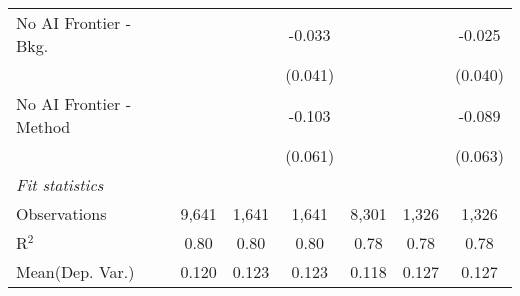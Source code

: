 \begin{tabular}{lcccccc}
   No AI Frontier - Bkg.   &         &              & -0.033  &         &              & -0.025\\   
                           &         &              & (0.041) &         &              & (0.040)\\   
   No AI Frontier - Method &         &              & -0.103  &         &              & -0.089\\   
                           &         &              & (0.061) &         &              & (0.063)\\   
   \midrule
   \emph{Fit statistics}\\
   Observations            & 9,641   & 1,641        & 1,641   & 8,301   & 1,326        & 1,326\\  
   R$^2$                   & 0.80    & 0.80         & 0.80    & 0.78    & 0.78         & 0.78\\  
Mean(Dep. Var.) & 0.120 & 0.123 & 0.123 & 0.118 & 0.127 & 0.127 \\
   

\end{tabular}
